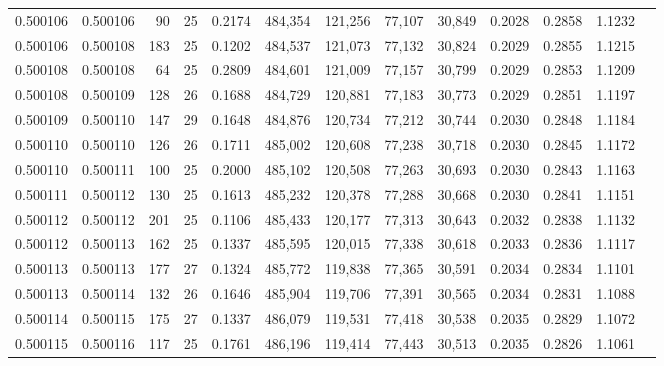 \begin{tabular}{rrrrrrrrrrrrr}
0.500106 & 0.500106 &  90 &  25 &                                     0.2174 & 484,354 & 121,256 &  77,107 &  30,849 & 0.2028 & 0.2858 & 1.1232 \\
0.500106 & 0.500108 & 183 &  25 &                                     0.1202 & 484,537 & 121,073 &  77,132 &  30,824 & 0.2029 & 0.2855 & 1.1215 \\
0.500108 & 0.500108 &  64 &  25 &                                     0.2809 & 484,601 & 121,009 &  77,157 &  30,799 & 0.2029 & 0.2853 & 1.1209 \\
0.500108 & 0.500109 & 128 &  26 &                                     0.1688 & 484,729 & 120,881 &  77,183 &  30,773 & 0.2029 & 0.2851 & 1.1197 \\
0.500109 & 0.500110 & 147 &  29 &                                     0.1648 & 484,876 & 120,734 &  77,212 &  30,744 & 0.2030 & 0.2848 & 1.1184 \\
0.500110 & 0.500110 & 126 &  26 &                                     0.1711 & 485,002 & 120,608 &  77,238 &  30,718 & 0.2030 & 0.2845 & 1.1172 \\
0.500110 & 0.500111 & 100 &  25 &                                     0.2000 & 485,102 & 120,508 &  77,263 &  30,693 & 0.2030 & 0.2843 & 1.1163 \\
0.500111 & 0.500112 & 130 &  25 &                                     0.1613 & 485,232 & 120,378 &  77,288 &  30,668 & 0.2030 & 0.2841 & 1.1151 \\
0.500112 & 0.500112 & 201 &  25 &                                     0.1106 & 485,433 & 120,177 &  77,313 &  30,643 & 0.2032 & 0.2838 & 1.1132 \\
0.500112 & 0.500113 & 162 &  25 &                                     0.1337 & 485,595 & 120,015 &  77,338 &  30,618 & 0.2033 & 0.2836 & 1.1117 \\
0.500113 & 0.500113 & 177 &  27 &                                     0.1324 & 485,772 & 119,838 &  77,365 &  30,591 & 0.2034 & 0.2834 & 1.1101 \\
0.500113 & 0.500114 & 132 &  26 &                                     0.1646 & 485,904 & 119,706 &  77,391 &  30,565 & 0.2034 & 0.2831 & 1.1088 \\
0.500114 & 0.500115 & 175 &  27 &                                     0.1337 & 486,079 & 119,531 &  77,418 &  30,538 & 0.2035 & 0.2829 & 1.1072 \\
0.500115 & 0.500116 & 117 &  25 &                                     0.1761 & 486,196 & 119,414 &  77,443 &  30,513 & 0.2035 & 0.2826 & 1.1061 \\

\end{tabular}
